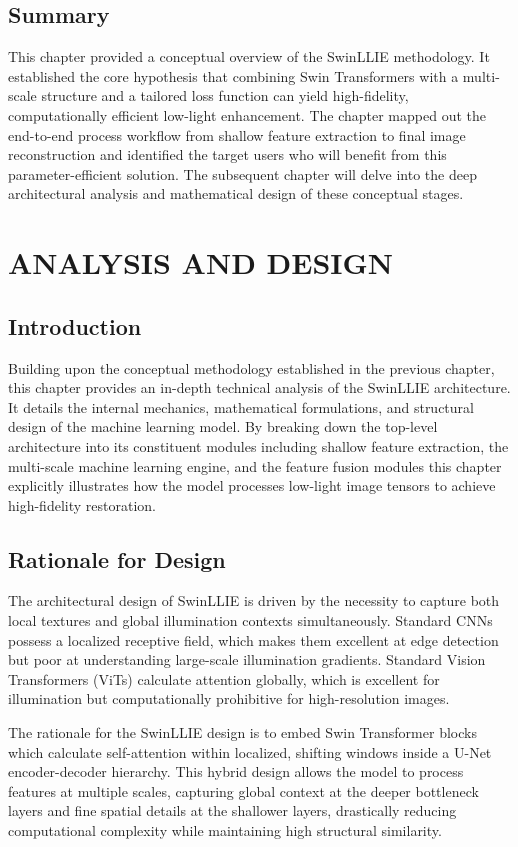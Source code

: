 \documentclass[12pt, a4paper]{report}
\begin{document}
\section{Summary}
This chapter provided a conceptual overview of the SwinLLIE methodology. It established the core hypothesis that combining Swin Transformers with a multi-scale structure and a tailored loss function can yield high-fidelity, computationally efficient low-light enhancement. The chapter mapped out the end-to-end process workflow from shallow feature extraction to final image reconstruction and identified the target users who will benefit from this parameter-efficient solution. The subsequent chapter will delve into the deep architectural analysis and mathematical design of these conceptual stages.


\chapter{ANALYSIS AND DESIGN}
\section{Introduction}
Building upon the conceptual methodology established in the previous chapter, this chapter provides an in-depth technical analysis of the SwinLLIE architecture. It details the internal mechanics, mathematical formulations, and structural design of the machine learning model. By breaking down the top-level architecture into its constituent modules including shallow feature extraction, the multi-scale machine learning engine, and the feature fusion modules this chapter explicitly illustrates how the model processes low-light image tensors to achieve high-fidelity restoration.

\section{Rationale for Design}
The architectural design of SwinLLIE is driven by the necessity to capture both local textures and global illumination contexts simultaneously. Standard CNNs possess a localized receptive field, which makes them excellent at edge detection but poor at understanding large-scale illumination gradients. Standard Vision Transformers (ViTs) calculate attention globally, which is excellent for illumination but computationally prohibitive for high-resolution images.

The rationale for the SwinLLIE design is to embed Swin Transformer blocks which calculate self-attention within localized, shifting windows inside a U-Net encoder-decoder hierarchy. This hybrid design allows the model to process features at multiple scales, capturing global context at the deeper bottleneck layers and fine spatial details at the shallower layers, drastically reducing computational complexity while maintaining high structural similarity.
\end{document}
